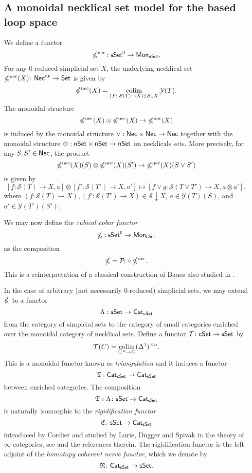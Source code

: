 \subsection{A monoidal necklical set model for the based loop space}
We define a functor 
$$\mathbb{\Omega}^{\text{nec}} \colon \mathsf{sSet}^0 \to \mathsf{Mon}_{\mathsf{nSet}}.$$
For any $0$-reduced simplicial set $X$, the underlying necklical set $\mathbb{\Omega}^{\text{nec}}(X) \colon \mathsf{Nec}^{op} \to \mathsf{Set}$ is given by
$$\mathbb{\Omega}^{\text{nec}}(X) = \operatorname*{colim}_{(f \colon \mathcal{S}(T) \to X) \in  \mathcal{S} \downarrow X} \mathcal{Y}(T).$$
The monoidal structure $$\mathbb{\Omega}^{\text{nec}}(X) \otimes \mathbb{\Omega}^{\text{nec}}(X) \to \mathbb{\Omega}^{\text{nec}}(X)$$
is induced by the monoidal structure $\vee: \mathsf{Nec} \times \mathsf{Nec} \to \mathsf{Nec}$ together with the monoidal structure $\otimes: \mathsf{nSet} \times \mathsf{nSet} \to \mathsf{nSet}$ on necklicals sets. More precisely, for any $S, S' \in \mathsf{Nec}$, the product $$\mathbb{\Omega}^{\text{nec}}(X)(S) \otimes \mathbb{\Omega}^{\text{nec}}(X)(S') \to \mathbb{\Omega}^{\text{nec}}(X)(S \vee S')$$ is given by $$[f\colon \mathcal{S}(T) \to X, a] \otimes [f'\colon \mathcal{S}(T') \to X, a'] \mapsto [f \vee g\colon \mathcal{S}(T\vee T') \to X, a \otimes  a'],$$
where $(f\colon \mathcal{S}(T) \to X), (f'\colon \mathcal{S}(T') \to X) \in \mathcal{S} \downarrow X$, $a\in \mathcal{Y}(T)(S)$, and $a'\in \mathcal{Y}(T')(S')$.

We may now define the \textit{cubical cobar functor} $$\mathbb{\Omega}: \mathsf{sSet}^0 \to \mathsf{Mon}_{\mathsf{cSet}}$$ as the composition $$\mathbb{\Omega}= \mathcal{P}_! \circ \mathbb{\Omega}^{\text{nec}}.$$ This is a reinterpretation of a classical construction of Baues \cite{baues1998hopf} also studied in \cite{rivera2018cubical}. 


\begin{remark}

In the case of arbitrary (not necessarily $0$-reduced) simplicial sets, we may extend  $\mathbb{\Omega}$ to a functor
$$\Lambda: \mathsf{sSet} \to \mathsf{Cat}_{\mathsf{cSet}}$$ from the category of simpicial sets to the category of small categories enriched over the monoidal category of necklical sets. Define a functor $\mathcal{T} \colon \mathsf{cSet} \to \mathsf{sSet}$ by $$\mathcal{T}(C) = \operatorname*{colim}_{\square^n \to C} (\Delta^1)^{\times n}.$$ This is a monoidal functor known as \textit{triangulation} and it induces a functor $$\mathfrak{T}: \mathsf{Cat}_{\mathsf{cSet}} \to \mathsf{Cat}_{\mathsf{sSet}}$$ between enriched categories. The composition 
$$\mathfrak{T} \circ \Lambda \colon \mathsf{sSet} \to \mathsf{Cat}_{\mathsf{sSet}}$$ is naturally isomorphic to the \textit{rigidification functor}
$$\mathfrak{C} \colon \mathsf{sSet} \to \mathsf{Cat}_{\mathsf{sSet}}$$
introduced by Cordier and studied by Lurie, Dugger and Spivak in the theory of $\infty$-categories, see \cite{rivera2018cubical} and the references therein. The rigidification functor is the left adjoint of the \textit{homotopy coherent nerve functor}, which we denote by
$$\mathfrak{N} \colon \mathsf{Cat}_{\mathsf{sSet}} \to \mathsf{sSet}.$$
\end{remark}

